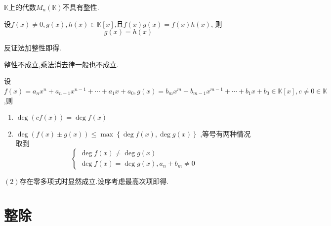 \begin{brown}
\begin{example}
    $\mathbb{K}$上的代数$M_n\left(\mathbb{K}\right)$不具有整性.
\end{example}
\end{brown}
\begin{green}
\begin{corollary}[乘法消去律]\label{cor:乘法消去律}
    设$f\left(x\right)\neq 0 ,g\left(x\right),
    h\left(x\right)\in \mathbb{K}\left[x\right]$,且$f\left(x\right)g\left(x\right)=f\left(x\right)h\left(x\right)$,
    则\[
    g\left(x\right)=h\left(x\right)
    \]
\end{corollary}
\begin{Proof}
反证法加整性即得.
\end{Proof}
\end{green}
\begin{red}
\begin{remark}
    整性不成立,乘法消去律一般也不成立.
\end{remark}
\end{red}
\begin{formal}
\begin{proposition}[关于次数的若干结果]\label{prop:关于次数的若干结果}
    设$f\left(x\right)=a_nx^n+a_{n-1}x^{n-1}+\cdots+a_1x+a_0,g\left(x\right)=b_mx^m+b_{m-1}x^{m-1}+\cdots+b_1x+b_0
    \in \mathbb{K}\left[x\right],c\neq 0\in \mathbb{K}$,则
    \begin{enumerate}[label={\textup{(\arabic*)}}]
        \item $\deg\left(cf\left(x\right)\right)=\deg f\left(x\right)$
        \item $\deg\left(f\left(x\right)\pm g\left(x\right)\right)\leqslant \max\left\{
            \deg f\left(x\right),\deg g\left(x\right)
        \right\}$ ,等号有两种情况取到
        \[
        \begin{cases*}
            \deg f\left(x\right)\neq \deg g\left(x\right)\\
            \deg f\left(x\right)=\deg g\left(x\right),a_n+b_m\neq 0
        \end{cases*}
        \]
    \end{enumerate}
\end{proposition}
\begin{Proof}
$(2)$存在零多项式时显然成立.设序考虑最高次项即得.
\end{Proof}
\end{formal}
\newpage
\section{整除}
